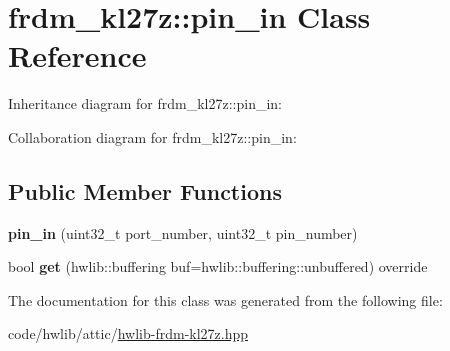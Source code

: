\hypertarget{classfrdm__kl27z_1_1pin__in}{}\section{frdm\+\_\+kl27z\+:\+:pin\+\_\+in Class Reference}
\label{classfrdm__kl27z_1_1pin__in}


Inheritance diagram for frdm\+\_\+kl27z\+:\+:pin\+\_\+in\+:


Collaboration diagram for frdm\+\_\+kl27z\+:\+:pin\+\_\+in\+:
\subsection*{Public Member Functions}
\begin{DoxyCompactItemize}
\item 
\mbox{\label{classfrdm__kl27z_1_1pin__in_a0ce041a0035e7c143471813a92b89675}} 
{\bfseries pin\+\_\+in} (uint32\+\_\+t port\+\_\+number, uint32\+\_\+t pin\+\_\+number)
\item 
\mbox{\label{classfrdm__kl27z_1_1pin__in_a26b8e43feff639f2705f90b40fa07f34}} 
bool {\bfseries get} (hwlib\+::buffering buf=hwlib\+::buffering\+::unbuffered) override
\end{DoxyCompactItemize}


The documentation for this class was generated from the following file\+:\begin{DoxyCompactItemize}
\item 
code/hwlib/attic/\hyperlink{hwlib-frdm-kl27z_8hpp}{hwlib-\/frdm-\/kl27z.\+hpp}\end{DoxyCompactItemize}
